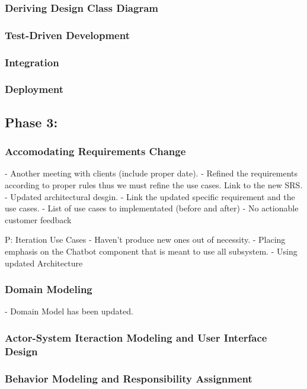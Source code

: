 \documentclass[11pt]{article}
\begin{document}
\subsubsection{Deriving Design Class Diagram}
  
\subsubsection{Test-Driven Development}
  
\subsubsection{Integration}
  
\subsubsection{Deployment}

\subsection{Phase 3:}

\subsubsection{Accomodating Requirements Change}
- Another meeting with clients (include proper date).
- Refined the requirements according to proper rules thus we must refine the use cases. Link to the new SRS.
- Updated architectural desgin.
- Link the updated specific requirement and the use cases.
- List of use cases to implementated (before and after)
- No actionable customer feedback

P: Iteration Use Cases
- Haven't produce new ones out of necessity.
- Placing emphasis on the Chatbot component that is meant to use all subsystem.
- Using updated Architecture

\subsubsection{Domain Modeling}
- Domain Model has been updated.

\subsubsection{Actor-System Iteraction Modeling and User Interface Design}

\subsubsection{Behavior Modeling and Responsibility Assignment}
\end{document}
